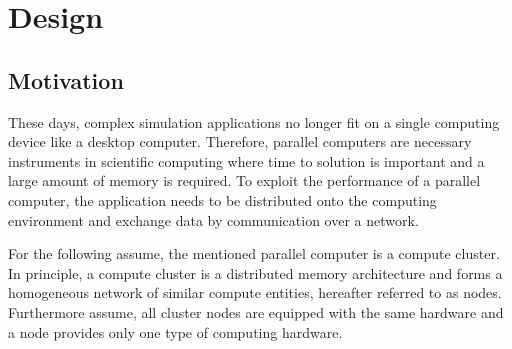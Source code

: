 \chapter{Design}
\label{sec:design}



\section{Motivation}
\label{sec:motivation}

These days, complex simulation applications no longer fit on a single
computing device like a desktop computer. Therefore, parallel
computers are necessary instruments in scientific computing where time
to solution is important and a large amount of memory is required.  To
exploit the performance of a parallel computer, the application needs
to be distributed onto the computing environment and exchange data by
communication over a network.

For the following assume, the mentioned
parallel computer is a compute cluster. In principle, a compute
cluster is a distributed memory architecture and forms a homogeneous
network of similar compute entities, hereafter referred to as nodes.
Furthermore assume, all cluster nodes are equipped with the same
hardware and a node provides only one type of computing hardware.

